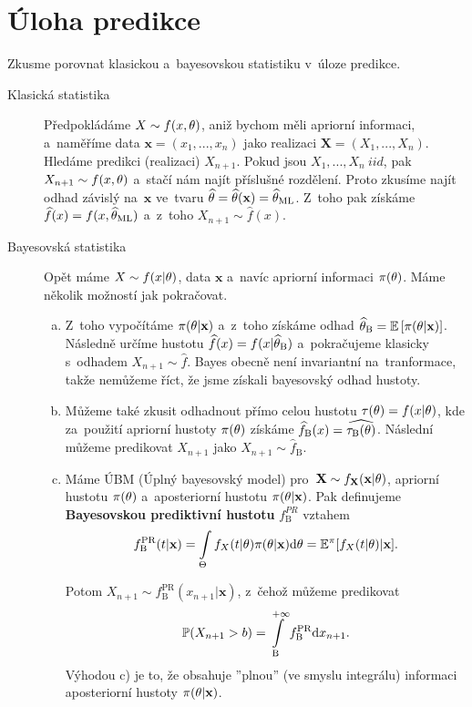 \section{Úloha predikce}
Zkusme porovnat klasickou a~bayesovskou statistiku v~úloze predikce.
\begin{description}
	\item[Klasická statistika] Předpokládáme $X\sim f(x,\theta)$, aniž bychom měli apriorní informaci, a~naměříme data $\textbf{x}=(x_1,...,x_n)$ jako realizaci $\textbf{X}=(X_1,...,X_n)$. Hledáme predikci (realizaci) $X_{n+1}$. Pokud jsou $X_1,...,X_n ~iid$, pak $X_{n+1}\sim f(x,\theta)$ a~stačí nám najít příslušné rozdělení. Proto zkusíme najít odhad závislý na~$\textbf{x}$ ve~tvaru $\widehat{\theta}=\widehat{\theta}(\textbf{x})=\widehat{\theta}_{\mathrm{ML}}$. Z~toho pak získáme $\widehat{f}(x)=f(x,\widehat{\theta}_\mathrm{ML})$ a~z~toho $X_{n+1}\sim\widehat{f}(x)$.
	\item[Bayesovská statistika] Opět máme $X\sim f(x|\theta)$, data $\textbf{x}$ a~navíc apriorní informaci $\pi(\theta)$. Máme několik možností jak pokračovat.
	\begin{enumerate}[a)]
		\item  Z~toho vypočítáme $\pi(\theta|\textbf{x})$ a~z~toho získáme odhad $\widehat{\theta}_\mathrm{B}=\mathbb{E}\left[ \pi(\theta|\textbf{x}) \right]$. Následně určíme hustotu $\widehat{f}(x)=f(x|\widehat{\theta}_\mathrm{B})$ a~pokračujeme klasicky s~odhadem $X_{n+1}\sim\widehat{f}$. Bayes obecně není invariantní na~tranformace, takže nemůžeme říct, že jsme získali bayesovský odhad hustoty.
		
		\item Můžeme také zkusit odhadnout přímo celou hustotu $\tau(\theta)=f(x|\theta)$, kde za~použití apriorní hustoty $\pi(\theta)$ získáme $\widehat{f}_\mathrm{B}(x)=\widehat{\tau_\mathrm{B}(\theta)}$. Následní můžeme predikovat $X_{n+1}$ jako $X_{n+1}\sim\widehat{f}_\mathrm{B}$.
		
		\item \begin{define} Máme ÚBM (Úplný bayesovský model) pro~$\textbf{X}\sim f_{\textbf{X}}(\textbf{x}|\theta)$, apriorní hustotu $\pi(\theta)$ a~aposteriorní hustotu $\pi(\theta|\textbf{x})$. Pak definujeme \textbf{Bayesovskou prediktivní hustotu} $f_\mathrm{B}^{PR} $ vztahem
			$$ f_\mathrm{B}^\mathrm{PR}(t|\textbf{x})=\int\limits_{\Theta} f_X(t|\theta)\pi(\theta|\textbf{x})\mathrm{d}\theta=\mathbb{E}^\pi[f_X(t|\theta)|\textbf{x}].$$
		\end{define}
		Potom
		$ X_{n+1}\sim f_\mathrm{B}^\mathrm{PR}(x_{n+1}|\textbf{x})$, z~čehož můžeme predikovat $$\mathbb{P}(X_{n+1}>b)=\int\limits_\mathrm{B}^{+\infty}f_\mathrm{B}^\mathrm{PR}\mathrm{d} x_{n+1}.$$
		Výhodou c) je to, že obsahuje ''plnou'' (ve smyslu integrálu) informaci aposteriorní hustoty $\pi(\theta|\textbf{x})$.
	\end{enumerate}
\end{description}




